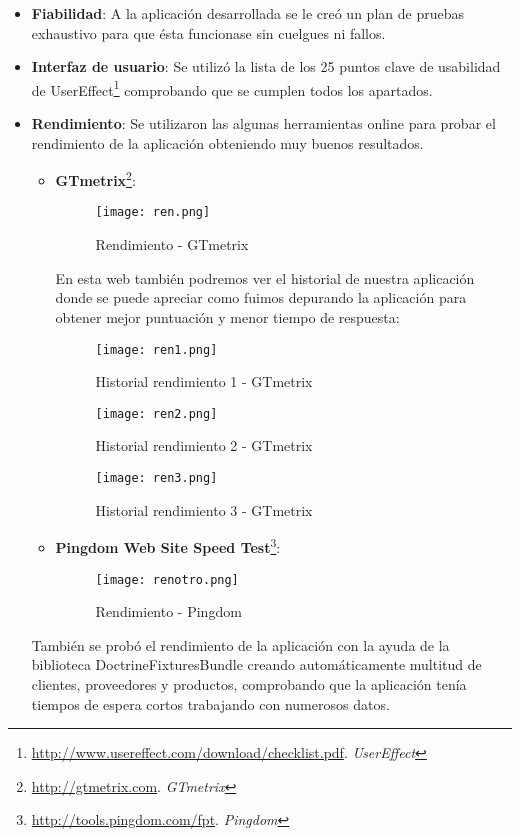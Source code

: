 \begin{itemize}
\item \textbf{Fiabilidad}: A la aplicación desarrollada se le creó un plan de pruebas exhaustivo para que ésta funcionase sin cuelgues ni fallos.

\item \textbf{Interfaz de usuario}: Se utilizó la lista de los 25 puntos clave de usabilidad de UserEffect\footnote{\url{http://www.usereffect.com/download/checklist.pdf}. \textit{UserEffect}} comprobando que se cumplen todos los apartados.

\item \textbf{Rendimiento}: Se utilizaron las algunas herramientas online para probar el rendimiento de la aplicación obteniendo muy buenos resultados.
\begin{itemize}\renewcommand{\labelitemi}{$\diamond$}
\item \textbf{GTmetrix}\footnote{\url{http://gtmetrix.com}. \textit{GTmetrix}}:

\begin{figure}[!htb]
  \centering
    \texttt{[image: ren.png]}
  \caption{Rendimiento - GTmetrix   }
  \label{a}
\end{figure}

En esta web también podremos ver el historial de nuestra aplicación donde se puede apreciar como fuimos depurando la aplicación para obtener mejor puntuación y menor tiempo de respuesta:

\begin{figure}[!htb]
  \centering
    \texttt{[image: ren1.png]}
  \caption{Historial rendimiento 1 - GTmetrix   }
  \label{a}
\end{figure}

\newpage
\begin{figure}[!htb]
  \centering
    \texttt{[image: ren2.png]}
  \caption{Historial rendimiento 2 - GTmetrix   }
  \label{a}
\end{figure}

\begin{figure}[!htb]
  \centering
    \texttt{[image: ren3.png]}
  \caption{Historial rendimiento 3 - GTmetrix   }
  \label{a}
\end{figure}


\newpage
\item \textbf{Pingdom Web Site Speed Test}\footnote{\url{http://tools.pingdom.com/fpt}. \textit{Pingdom}}: 

\begin{figure}[!htb]
  \centering
    \texttt{[image: renotro.png]}
  \caption{Rendimiento - Pingdom}
  \label{a}
\end{figure}

\end{itemize}

También se probó el rendimiento de la aplicación con la ayuda de la biblioteca DoctrineFixturesBundle creando automáticamente multitud de clientes, proveedores y productos, comprobando que la aplicación tenía tiempos de espera cortos trabajando con numerosos datos.

\end{itemize}
